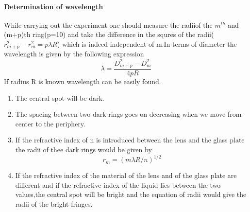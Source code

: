 \paragraph{Determination of wavelength}
While carrying out the experiment one should measure the radiiof the $m^{{th}}$ and (m+p)th ring(p=10) and take the difference in the squres of the radii($r^2_{m+p}-r_m^2=p\lambda R$) which is indeed independent of m.In terms of diameter the wavelength is given by the following expression \\
$$\lambda=\frac{D^2_{m+p}-D^2_m}{4pR}$$
If radius R is known wavelength can be easily found.\\
\begin{note}
	\begin{enumerate}
		\item The central spot will be dark.
		\item The spacing between two dark rings goes on decreasing when we move  from center to the periphery.
		\item If the refractive index of n is introduced between the lens and the glass plate the radii of thee dark rings would be given by
		$$ r_m=(m\lambda R/n)^{1/2}$$
		\item If the refractive index of the material of the lens and of the glass plate are different and if the refractive index of the liquid lies between the two values,the central spot will be bright and the equation of radii would give the radii of the bright fringes.
	\end{enumerate}
\end{note}
